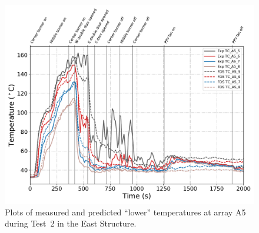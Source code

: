 \begin{figure}[!h]
	\centering
	\includegraphics[width=\columnwidth]{Figures/Plots/Validation/Temperature/Test_2_TC_A5_lower}
	\caption{Plots of measured and predicted ``lower'' temperatures at array A5 during Test~2 in the East Structure.}
	\label{fig:TCA5_lower_data_Test2}
\end{figure}




